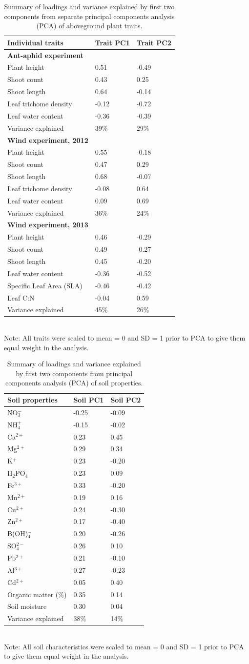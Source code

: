 \documentclass[11pt]{article}
\begin{document}
\begin{table}
\centering
\caption{Summary of loadings and variance explained by first
two components from separate principal components analysis (PCA) of
aboveground plant traits.}
\label{traitPCA}
\begin{tabular}{@{}lll@{}}
\toprule
Individual traits & Trait PC1 & Trait
PC2\tabularnewline
\midrule
\textbf{Ant-aphid experiment} & &\tabularnewline
Plant height & 0.51 & -0.49\tabularnewline
Shoot count & 0.43 & 0.25\tabularnewline
Shoot length & 0.64 & -0.14\tabularnewline
Leaf trichome density & -0.12 & -0.72\tabularnewline
Leaf water content & -0.36 & -0.39\tabularnewline
Variance explained & 39\% & 29\% \\ %
\textbf{Wind experiment, 2012} & &\tabularnewline
Plant height & 0.55 & -0.18\tabularnewline
Shoot count & 0.47 & 0.29\tabularnewline
Shoot length & 0.68 & -0.07\tabularnewline
Leaf trichome density & -0.08 & 0.64\tabularnewline
Leaf water content & 0.09 & 0.69\tabularnewline
Variance explained & 36\% & 24\% \\ %
\textbf{Wind experiment, 2013} & &\tabularnewline
Plant height & 0.46 & -0.29\tabularnewline
Shoot count & 0.49 & -0.27\tabularnewline
Shoot length & 0.45 & -0.20\tabularnewline
Leaf water content & -0.36 & -0.52\tabularnewline
Specific Leaf Area (SLA) & -0.46 & -0.42\tabularnewline
Leaf C:N & -0.04 & 0.59\tabularnewline
Variance explained & 45\% & 26\%\tabularnewline
\bottomrule
\end{tabular}
\bigskip{}
\\
{\footnotesize Note: All traits were scaled to mean = 0 and SD = 1
prior to PCA to give them equal weight in the analysis.}
\end{table}



\begin{table}
\centering
\caption{Summary of loadings and variance explained by first
two components from principal components analysis (PCA) of soil
properties.}
\label{soilPCA}
\begin{tabular}{@{}lll@{}}
\toprule
Soil properties & Soil PC1 & Soil
PC2\tabularnewline
\midrule
NO$_3^-$ & -0.25 & -0.09\tabularnewline
NH$_4^+$ & -0.15 & -0.02\tabularnewline
Ca$^{2+}$ & 0.23 & 0.45\tabularnewline
Mg$^{2+}$ & 0.29 & 0.34\tabularnewline
K$^+$ & 0.23 & -0.20\tabularnewline
H$_2$PO$_4^-$ & 0.23 & 0.09\tabularnewline
Fe$^{3+}$ & 0.33 & -0.20\tabularnewline
Mn$^{2+}$ & 0.19 & 0.16\tabularnewline
Cu$^{2+}$ & 0.24 & -0.30\tabularnewline
Zn$^{2+}$ & 0.17 & -0.40\tabularnewline
B(OH)$_4^-$ & 0.20 & -0.26\tabularnewline
SO$_4^{2-}$ & 0.26 & 0.10\tabularnewline
Pb$^{2+}$ & 0.21 & -0.10\tabularnewline
Al$^{3+}$ & 0.27 & -0.23\tabularnewline
Cd$^{2+}$ & 0.05 & 0.40\tabularnewline
Organic matter (\%) & 0.35 & 0.14\tabularnewline
Soil moisture & 0.30 & 0.04\tabularnewline
Variance explained & 38\% & 14\%\tabularnewline
\bottomrule
\end{tabular}
\bigskip{}
\\
{\footnotesize Note: All soil characteristics were scaled to mean = 0 and SD = 1
prior to PCA to give them equal weight in the analysis.}
\end{table}
\end{document}

